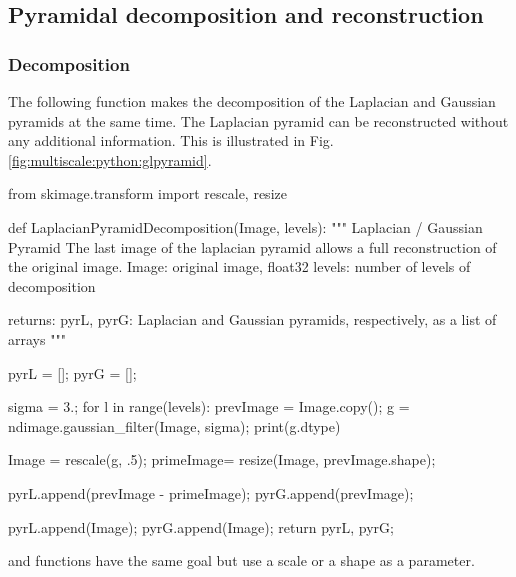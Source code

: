 \def\QRCODE{TB_image_TUT.IMG.multiscale_pythonqrcode.png}
\def\QRPAGE{http://www.iptutorials.science/tree/master/TB_image/TUT.IMG.multiscale/python}

\subsection{Pyramidal decomposition and re\-cons\-truc\-tion}
\subsubsection{Decomposition}
The following function makes the decomposition of the Laplacian and Gaussian pyramids at the same time. The Laplacian pyramid can be reconstructed without any additional information. This is illustrated in Fig. \ref{fig:multiscale:python:glpyramid}.


\begin{python}
from skimage.transform import rescale, resize

def LaplacianPyramidDecomposition(Image, levels):
    """
    Laplacian / Gaussian Pyramid
    The last image of the laplacian pyramid allows a full reconstruction of the original image.
    Image: original image, float32
    levels: number of levels of decomposition
    
    returns: pyrL, pyrG: Laplacian and Gaussian pyramids, respectively, as a list of arrays
    """
    
    pyrL = [];
    pyrG = [];
    
    sigma = 3.;
    for l in range(levels):
        prevImage = Image.copy();
        g = ndimage.gaussian_filter(Image, sigma);
        print(g.dtype)
        
        Image = rescale(g, .5);
        primeImage= resize(Image, prevImage.shape);
        
        pyrL.append(prevImage - primeImage);
        pyrG.append(prevImage);
        
    pyrL.append(Image);
    pyrG.append(Image);
    return pyrL, pyrG;
\end{python}

\begin{phelp}
 and  functions have the same goal but use a scale or a shape as a parameter.
\end{phelp}



